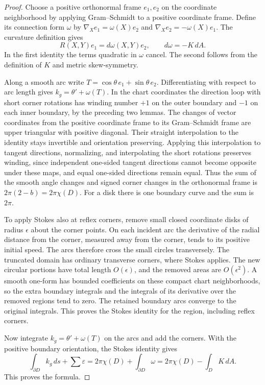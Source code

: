 \documentclass[11pt,oneside,openany]{book}
\theoremstyle{plain}
\theoremstyle{definition}
\theoremstyle{remark}
\begin{document}
\begin{proof}
Choose a positive orthonormal frame \(e_1,e_2\) on the
coordinate neighborhood by applying Gram--Schmidt to a
positive coordinate frame. Define its connection form
\(\omega\) by
\(\nabla_Xe_1=\omega(X)e_2\) and
\(\nabla_Xe_2=-\omega(X)e_1\).
The curvature definition gives
\[
 R(X,Y)e_1=d\omega(X,Y)e_2,\qquad d\omega=-K\,dA .
\]
In the first identity the terms quadratic in \(\omega\)
cancel. The second follows from the definition of \(K\)
and metric skew-symmetry.

Along a smooth arc write \(T=\cos\theta\,e_1+\sin\theta\,e_2\).
Differentiating with respect to arc length gives
\(k_g=\theta'+\omega(T)\). In the chart coordinates the
direction loop with short corner rotations has winding number
\(+1\) on the outer boundary and \(-1\) on each inner boundary,
by the preceding two lemmas. The changes
of vector coordinates from the positive coordinate frame
to its Gram--Schmidt frame are upper triangular with
positive diagonal. Their straight interpolation to the
identity stays invertible and orientation preserving.
Applying this interpolation to tangent directions,
normalizing, and interpolating the short rotations
preserves winding, since independent one-sided tangent
directions cannot become opposite under these maps, and
equal one-sided directions remain equal. Thus the sum
of the smooth angle changes and signed corner changes
in the orthonormal frame is \(2\pi(2-b)=2\pi\chi(D)\).
For a disk there is one boundary curve and the sum is \(2\pi\).

To apply Stokes also at reflex corners, remove small closed
coordinate disks of radius \(\epsilon\) about the corner
points. On each incident arc the derivative of the radial
distance from the corner, measured away from the corner,
tends to its positive initial speed. The arcs therefore
cross the small circles transversely. The truncated domain
has ordinary transverse corners, where Stokes applies.
The new circular portions have total length \(O(\epsilon)\),
and the removed areas are \(O(\epsilon^2)\). A smooth
one-form has bounded coefficients on these compact chart
neighborhoods, so the extra boundary integrals and the
integrals of its derivative over the removed regions tend
to zero. The retained boundary arcs converge to the original
integrals. This proves the Stokes identity for the region,
including reflex corners.

Now integrate \(k_g=\theta'+\omega(T)\) on the arcs and
add the corners. With the positive boundary orientation,
the Stokes identity gives
\[
 \int_{\partial D}k_g\,ds+\sum\varepsilon
 =2\pi\chi(D)+\int_{\partial D}\omega
 =2\pi\chi(D)-\int_DK\,dA .
\]
This proves the formula.
\end{proof}
\end{document}
